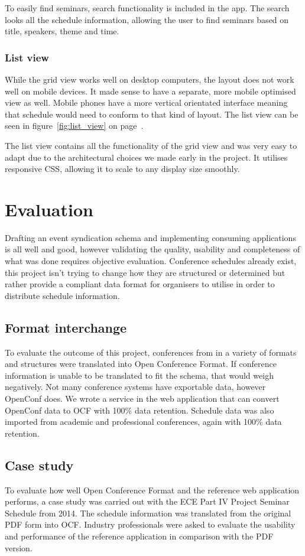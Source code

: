 \documentclass[conference]{IEEEtran}
\begin{document}
To easily find seminars, search functionality is included in the app. The search looks all the schedule information, allowing the user to find seminars based on title, speakers, theme and time.

\subsubsection{List view}
While the grid view works well on desktop computers, the layout does not work well on mobile devices. It made sense to have a separate, more mobile optimised view as well. Mobile phones have a more vertical orientated interface meaning that schedule would need to conform to that kind of layout. The list view can be seen in figure~\ref{fig:list_view} on page~\pageref{fig:list_view}.

The list view contains all the functionality of the grid view and was very easy to adapt due to the architectural choices we made early in the project. It utilises responsive CSS, allowing it to scale to any display size smoothly.

\section{Evaluation}

Drafting an event syndication schema and implementing consuming applications is all well and good, however validating the quality, usability and completeness of what was done requires objective evaluation. Conference schedules already exist, this project isn't trying to change how they are structured or determined but rather provide a compliant data format for organisers to utilise in order to distribute schedule information.

\subsection{Format interchange}
To evaluate the outcome of this project, conferences from in a variety of formats and structures were translated into Open Conference Format. If conference information is unable to be translated to fit the schema, that would weigh negatively. Not many conference systems have exportable data, however OpenConf does. We wrote a service in the web application that can convert OpenConf data to OCF with 100\% data retention. Schedule data was also imported from academic and professional conferences, again with 100\% data retention.

\subsection{Case study}
To evaluate how well Open Conference Format and the reference web application performs, a case study was carried out with the ECE Part IV Project Seminar Schedule from 2014. The schedule information was translated from the original PDF form into OCF. Industry professionals were asked to evaluate the usability and performance of the reference application in comparison with the PDF version.
\end{document}
